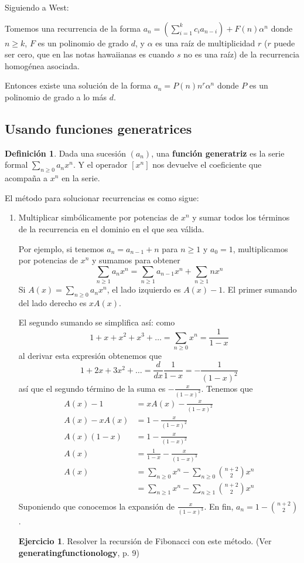 \documentclass[spanish]{book}
\theoremstyle{definition}
\newtheorem*{defn}{Definición}
\newtheorem*{ejer}{Ejercicio}
\begin{document}
	Siguiendo a West:
	\begin{teo}
		Tomemos una recurrencia de la forma $a_n=(\sum_{i=1}^kc_ia_{n-i})+F(n)\alpha^n$ donde $n\geq k$, $F$ es un polinomio de grado $d$, y $\alpha$ es una raíz de multiplicidad $r$ ($r$ puede ser cero, que en las notas hawaiianas es cuando $s$ no es una raíz) de la recurrencia homogénea asociada.
		
		Entonces existe una solución de la forma $a_n=P(n)n^r\alpha^n$ donde $P$ es un polinomio de grado a lo más $d$.
	\end{teo}

\subsection{Usando funciones generatrices}\label{sec:res-rec-fg}
\begin{defn}
	Dada una sucesión $(a_n)$, una \textbf{función generatriz} es la serie formal $\sum_{n\geq0}a_nx^n$. Y el operador $[x^n]$ nos devuelve el coeficiente que acompaña a $x^n$ en la serie.
\end{defn}
El método para solucionar recurrencias es como sigue:
\begin{enumerate}
	\item Multiplicar simbólicamente por potencias de $x^n$ y sumar todos los términos de la recurrencia en el dominio en el que sea válida.
	
	Por ejemplo, si tenemos $a_n=a_{n-1}+n$ para $n\geq1$ y $a_0=1$, multiplicamos por potencias de $x^n$ y sumamos para obtener
	\[\sum_{n\geq1}a_nx^n=\sum_{n\geq 1}a_{n-1}x^n+\sum_{n\geq1}nx^n\]
	Si $A(x)=\sum_{n\geq0}a_nx^n$, el lado izquierdo es $A(x)-1$. El primer sumando del lado derecho es $xA(x)$.
	
	El segundo sumando se simplifica así: como
	 \[1+x+x^2+x^3+\ldots=\sum_{n\geq0}x^n=\frac{1}{1-x}\]
	al derivar esta expresión obtenemos que
	\[1+2x+3x^2+\ldots=\frac{d}{dx}\frac{1}{1-x}=-\frac{1}{(1-x)^2}\]
	así que el segundo término de la suma es $-\frac{x}{(1-x)^2}$. Tenemos que
	\begin{align*}
		A(x)-1&=xA(x)-\frac{x}{(1-x)^2}\\ A(x)-xA(x)&=1-\frac{x}{(1-x)^2}\\
		A(x)(1-x)&=1-\frac{x}{(1-x)^2}\\
		A(x)&=\frac{1}{1-x}-\frac{x}{(1-x)^3}\\
		A(x)&=\sum_{n\geq0}x^n-\sum_{n\geq0}{n+2\choose 2}x^n\\
		&=\sum_{n\geq1}x^n-\sum_{n\geq1}{n+2\choose 2}x^n\\
	\end{align*}
	Suponiendo que conocemos la expansión de $\frac{x}{(1-x)^3}$. En fin, $a_n=1-{n+2\choose 2}$.
	\begin{ejer}
		Resolver la recursión de Fibonacci con este método. (Ver \textbf{generatingfunctionology}, p. 9)
	\end{ejer}
	
\end{enumerate}
\end{document}
